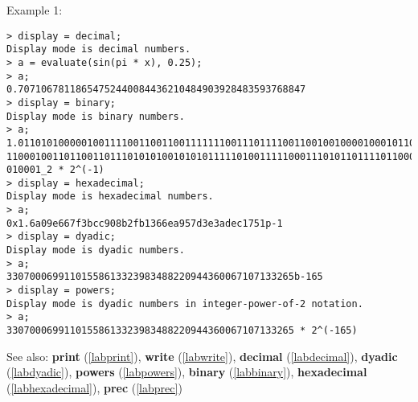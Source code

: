 \noindent Example 1: 
\begin{center}\begin{minipage}{15cm}\begin{Verbatim}[frame=single]
> display = decimal;
Display mode is decimal numbers.
> a = evaluate(sin(pi * x), 0.25);
> a;
0.70710678118654752440084436210484903928483593768847
> display = binary;
Display mode is binary numbers.
> a;
1.011010100000100111100110011001111111001110111100110010010000100010110010111110
11000100110110011011101010100101010111110100111110001110101101111011000001011101
010001_2 * 2^(-1)
> display = hexadecimal;
Display mode is hexadecimal numbers.
> a;
0x1.6a09e667f3bcc908b2fb1366ea957d3e3adec1751p-1
> display = dyadic;
Display mode is dyadic numbers.
> a;
33070006991101558613323983488220944360067107133265b-165
> display = powers;
Display mode is dyadic numbers in integer-power-of-2 notation.
> a;
33070006991101558613323983488220944360067107133265 * 2^(-165)
\end{Verbatim}
\end{minipage}\end{center}
See also: \textbf{print} (\ref{labprint}), \textbf{write} (\ref{labwrite}), \textbf{decimal} (\ref{labdecimal}), \textbf{dyadic} (\ref{labdyadic}), \textbf{powers} (\ref{labpowers}), \textbf{binary} (\ref{labbinary}), \textbf{hexadecimal} (\ref{labhexadecimal}), \textbf{prec} (\ref{labprec})
